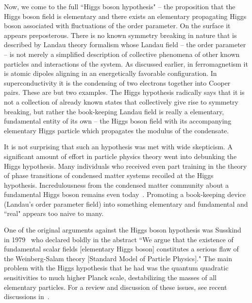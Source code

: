 \documentclass[letter,12pt]{article}
\begin{document}
Now, we come to the full ``Higgs boson hypothesis" -- the proposition that the Higgs boson field is elementary and there exists an elementary propagating Higgs boson associated with fluctuations of the order parameter. On the surface it appears preposterous. There is no known symmetry breaking in nature that is described by Landau theory formalism whose Landau field -- the order parameter -- is not merely a simplified description of collective phenomena of other known particles and interactions of the system.  As discussed earlier, in ferromagnetism it is atomic dipoles aligning in an energetically favorable configuration. In superconductivity it is the condensing of two electrons together into Cooper pairs. These are but two examples. The Higgs hypothesis radically says that it is not a collection of already known states that collectively give rise to symmetry breaking, but rather the book-keeping Landau field is really a elementary, fundamental entity of its own -- the Higgs boson field with its accompanying elementary Higgs particle which propagates the modulus of the condensate.  

It is not surprising that such an hypothesis was met with wide skepticism.  A significant amount of effort in particle physics theory went into debunking the Higgs hypothesis. Many individuals who received even part training in the theory of phase transitions of condensed matter systems recoiled at the Higgs hypothesis. Incredulousness from the condensed matter community about a fundamental Higgs boson remains even today~\cite{Anderson:2015}. Promoting a book-keeping device (Landau's order parameter field) into something elementary and fundamental and ``real" appears too naive to many.  

One of the original arguments against the Higgs boson hypothesis was Susskind in 1979~\cite{Susskind:1978ms} who declared boldly in the abstract ``We argue that the existence of fundamental scalar fields [elementary Higgs boson] constitutes a serious flaw of the Weinberg-Salam theory [Standard Model of Particle Physics]." The main problem with the Higgs hypothesis that he had was the quantum quadratic sensitivities to much higher Planck scale, destabilizing the masses of all elementary particles. For a review and discussion of these issues, see recent discussions in~\cite{Giudice:2008bi,Wells:2013tta,Wells:2016luz}.
\end{document}
